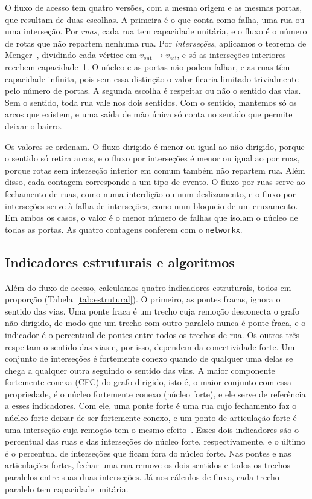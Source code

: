O fluxo de acesso tem quatro versões, com a mesma origem e as mesmas portas,
que resultam de duas escolhas. A primeira é o que conta como falha, uma rua ou
uma interseção. Por \emph{ruas}, cada rua tem capacidade unitária, e o fluxo é
o número de rotas que não repartem nenhuma rua. Por \emph{interseções},
aplicamos o teorema de Menger~\cite{menger1927}, dividindo cada vértice em
$v_{\text{ent}}\to v_{\text{sai}}$, e só as interseções interiores recebem
capacidade~1. O núcleo e as portas não podem falhar, e as ruas têm capacidade
infinita, pois sem essa distinção o valor ficaria limitado trivialmente pelo
número de portas. A segunda escolha é respeitar ou não o sentido das vias. Sem
o sentido, toda rua vale nos dois sentidos. Com o sentido, mantemos só os arcos
que existem, e uma saída de mão única só conta no sentido que permite deixar o
bairro.

Os valores se ordenam. O fluxo dirigido é menor ou igual ao não dirigido,
porque o sentido só retira arcos, e o fluxo por interseções é menor ou igual ao
por ruas, porque rotas sem interseção interior em comum também não repartem
rua. Além disso, cada contagem corresponde a um tipo de evento. O fluxo por
ruas serve ao fechamento de ruas, como numa interdição ou num deslizamento, e o
fluxo por interseções serve à falha de interseções, como num 
bloqueio de um cruzamento. Em ambos os casos, o valor é o menor número de
falhas que isolam o núcleo de todas as portas. As quatro contagens conferem com
o \texttt{networkx}.

\subsection{Indicadores estruturais e algoritmos}
\label{sec:algos}

Além do fluxo de acesso, calculamos quatro indicadores estruturais, todos em proporção
(Tabela~\ref{tab:estrutural}). O primeiro, as pontes fracas, ignora o sentido
das vias. Uma ponte fraca é um trecho cuja remoção desconecta o grafo não
dirigido, de modo que um trecho com outro paralelo nunca é ponte fraca, e o
indicador é o percentual de pontes entre todos os trechos de rua. Os outros
três respeitam o sentido das vias e, por isso, dependem da conectividade
forte. Um conjunto de interseções é fortemente conexo quando de qualquer uma
delas se chega a qualquer outra seguindo o sentido das vias. A maior
componente fortemente conexa (CFC) do grafo dirigido, isto é, o maior
conjunto com essa propriedade, é o núcleo fortemente conexo (núcleo forte), e
ele serve de referência a esses indicadores. Com ele, uma ponte forte é uma
rua cujo fechamento faz o núcleo forte deixar de ser fortemente conexo, e um
ponto de articulação forte é uma interseção cuja remoção tem o mesmo
efeito~\cite{italiano2012finding}. Esses dois indicadores são o percentual das
ruas e das interseções do núcleo forte, respectivamente, e o último é o
percentual de interseções que ficam fora do núcleo forte. Nas pontes e nas
articulações fortes, fechar uma rua remove os dois sentidos e todos os trechos
paralelos entre suas duas interseções. Já nos cálculos de fluxo, cada trecho
paralelo tem capacidade unitária.

